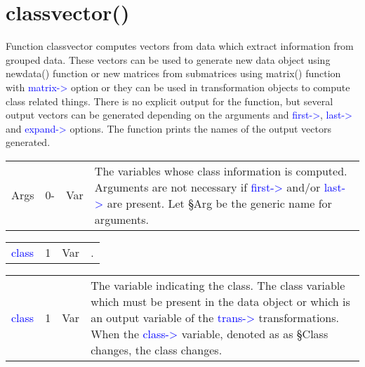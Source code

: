 \section{classvector()}
\label{classvector}
Function classvector computes vectors from data which extract information from grouped
data. These vectors can be used to generate new data object using \textcolor{VioletRed}{newdata}() function or
new matrices from submatrices using \textcolor{VioletRed}{matrix}() function with \textcolor{blue}{matrix->} option or
 they can be used in transformation objects to compute class related things.
There is no explicit output for the function, but several output vectors can
 be generated depending on the arguments and \textcolor{blue}{first->}, \textcolor{blue}{last->} and
 \textcolor{blue}{expand->} options. The function prints the names of the output vectors generated.
\begin{table}[H]
\begin{tabular}{ m{}  m{}m{}p{}}
Args&0-&Var& The variables whose class information is computed. Arguments
 are not necessary if \textcolor{blue}{first->} and/or \textcolor{blue}{last->} are present.
Let §Arg be the generic name for arguments.
\\ \cline{1-4}
\end{tabular}
\end{table}
\vspace{-1.51em}
\begin{table}[H]
\begin{tabular}{ m{}  m{}m{}p{}}
\textcolor{blue}{class}&1&Var& .
\\ \cline{1-4}
\end{tabular}
\end{table}
\vspace{-1.51em}
\begin{table}[H]
\begin{tabular}{ m{}  m{}m{}p{}}
\textcolor{blue}{class}&1&Var&The variable indicating the class. The class variable which must be present in the data object or which is
an output variable of the \textcolor{blue}{trans->} transformations.
When the \textcolor{blue}{class->} variable, denoted as
as §Class changes,
the class changes.
\\ \cline{1-4}
\end{tabular}
\end{table}
\vspace{-1.51em}
